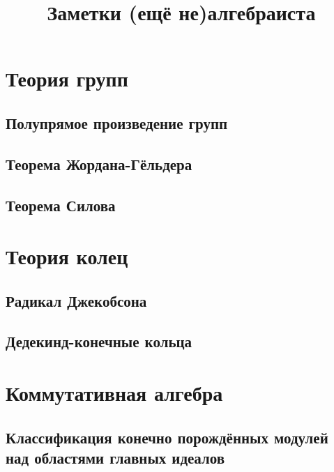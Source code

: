 \documentclass[12pt]{amsart}
\title{Заметки (ещё не)алгебраиста}
\author{}
\numberwithin{theorem}{subsection}
\theoremstyle{definition}
\begin{document}
\maketitle

\tableofcontents

\section{Теория групп}

\subsection{Полупрямое произведение групп}



\subsection{Теорема Жордана-Гёльдера}



\subsection{Теорема Силова}



\section{Теория колец}

\subsection{Радикал Джекобсона}



\subsection{Дедекинд-конечные кольца}




\section{Коммутативная алгебра}

\subsection{Классификация конечно порождённых модулей над областями главных идеалов}







\begin{thebibliography}{2}
	

\end{thebibliography}
	
	

	
\end{document}

